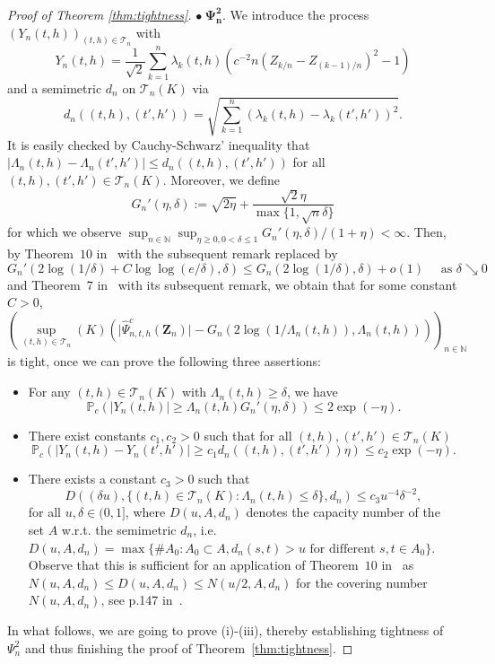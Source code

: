 \documentclass[10.5pt,letter]{article}
\numberwithin{equation}{section}
\theoremstyle{definition}
\newcommand{\N}{\mathbb{N}}
\renewcommand{\P}{\mathbb{P}}
\newcommand{\1}{\mathbbm{1}}
\begin{document}
\begin{proof}[Proof of Theorem \ref{thm:tightness}]
$\bullet\ \mathbf{\Psi_n^2}$.
We introduce the process $(Y_n(t,h))_{(t,h)\in\mathcal{T}_n}$ with
\[ Y_n(t,h) = \frac{1}{\sqrt{2}}\sum_{k=1}^n \lambda_k(t,h)\left( c^{-2}n\left( Z_{k/n}-Z_{(k-1)/n}\right)^2-1\right)\]
and a semimetric $d_n$ on $\mathcal{T}_n(K)$ via
\[ d_n((t,h),(t',h')) =  \sqrt{\sum_{k=1}^n \left( \lambda_k(t,h) - \lambda_k(t',h')\right)^2}. \]
It is easily checked by Cauchy-Schwarz' inequality that $|\Lambda_n(t,h)-\Lambda_n(t',h')|\leq d_n((t,h),(t',h'))$ for all $(t,h),(t',h')\in\mathcal{T}_n(K)$. Moreover, we define
\[ G_n'(\eta,\delta) :=  \sqrt{2\eta}+ \frac{\sqrt{2}\eta}{\max\{1,\sqrt{n}\delta\}} \]
for which we observe $\sup_{n\in\N}\sup_{\eta\geq 0, 0<\delta\leq 1} G_n'(\eta,\delta)/(1+\eta)<\infty$. Then, by Theorem~$10$ in~\cite{Rohde2009} with the subsequent remark replaced by
\[ G_n'(2\log(1/\delta)+C\log\log(e/\delta),\delta) \leq G_n(2\log(1/\delta),\delta) + o(1)\quad\textrm{ as }\delta\searrow 0\]
and Theorem~$7$ in~\cite{Dumbgen_report} with its subsequent remark, we obtain that for some constant $C>0$,
\[ \left( \sup_{(t,h)\in\mathcal{T}_n}(K) \left( \big|\hat{\Psi}_{n,t,h}^c(\mathbf{Z}_n)\big| - G_n\left( 2\log(1/\Lambda_n(t,h)), \Lambda_n(t,h)\right)\right) \right)_{n\in\N}\]
is tight, once we can prove the following three assertions:
\begin{itemize}
    \item[(i)] For any $(t,h)\in\mathcal{T}_n(K)$ with $\Lambda_n(t,h)\geq\delta$, we have
    \[ \P_c\left( |Y_n(t,h)| \geq \Lambda_n(t,h) G_n'(\eta,\delta)\right) \leq 2\exp\left(-\eta\right).\]
    \item[(ii)] There exist constants $c_1,c_2>0$ such that for all $(t,h),(t',h')\in\mathcal{T}_n(K)$
    \[ \P_c\left( |Y_n(t,h)-Y_n(t',h')|\geq c_1 d_n((t,h),(t',h'))\eta\right) \leq c_2\exp\left(-\eta\right).\]
    \item[(iii)] There exists a constant $c_3>0$ such that
    \[ D\left( (\delta u), \{(t,h)\in\mathcal{T}_n(K): \Lambda_n(t,h)\leq\delta\},d_n\right) \leq c_3 u^{-4}\delta^{-2},\]
    for all $u,\delta\in(0,1]$, where $D(u,A,d_n)$ denotes the capacity number of the set $A$ w.r.t. the semimetric $d_n$, i.e. $D(u,A,d_n) = \max\{ \# A_0: A_0\subset A, d_n(s,t)>u \textrm{ for different } s,t\in A_0\}$. Observe that this is sufficient for an application of Theorem~$10$ in~\cite{Rohde2009} as $N(u,A,d_n)\leq D(u,A,d_n)\leq N(u/2,A,d_n)$ for the covering number $N(u,A,d_n)$, see p.147 in~\cite{Vaart/Wellner}.
\end{itemize}
In what follows, we are going to prove (i)-(iii), thereby establishing tightness of $\Psi_n^2$ and thus finishing the proof of Theorem~\ref{thm:tightness}.\medskip



\end{proof}
\end{document}
